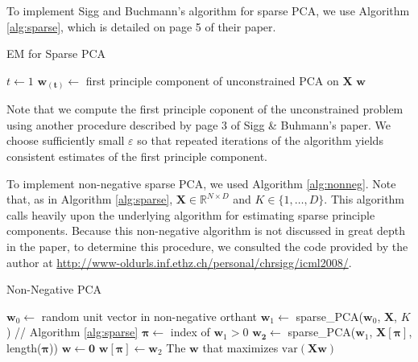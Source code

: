 \documentclass[twocolumn]{article}
\begin{document}
To implement Sigg and Buchmann's algorithm for sparse PCA,
we use Algorithm \ref{alg:sparse}, which is detailed on
page 5 of their paper.

\begin{algorithm}[H]\dontprintsemicolon
  \caption{EM for Sparse PCA}
  \label{alg:sparse}
  $t \leftarrow 1$ \;
  $\mathbf{w_{(t)}} \leftarrow$ first principle component
  of unconstrained PCA on $\mathbf{X}$ \;
  \Return $\mathbf{w}$
\end{algorithm}

Note that we compute the first principle coponent of the
unconstrained problem using another procedure described by
page 3 of Sigg \& Buhmann's paper.
We choose sufficiently small $\varepsilon$ so that repeated
iterations of the algorithm yields consistent estimates of
the first principle component.

To implement non-negative sparse PCA, we used Algorithm \ref{alg:nonneg}.
Note that, as in Algorithm \ref{alg:sparse},
$\mathbf{X} \in \mathds{R}^{ N\times D}$ and $K \in \{1, \ldots, D\}$.
This algorithm calls heavily upon the underlying algorithm for
estimating sparse principle components.
Because this non-negative algorithm is not discussed in great depth
in the paper, to determine this procedure, we consulted the code
provided by the author at
\url{http://www-oldurls.inf.ethz.ch/personal/chrsigg/icml2008/}.

\begin{algorithm}[H]\dontprintsemicolon
  \caption{Non-Negative PCA}
  \label{alg:nonneg}
   {
    $\mathbf{w}_0 \leftarrow$ random unit vector in non-negative orthant \;
    $\mathbf{w}_1 \leftarrow$ sparse\_PCA($\mathbf{w}_0$, $\mathbf{X}$, $K$)
      // Algorithm \ref{alg:sparse} \;
    $\boldsymbol\pi \leftarrow$ index of $\mathbf{w}_1 > 0$ \;
    $\mathbf{w_2} \leftarrow$ sparse\_PCA($\mathbf{w}_1$,
    $\mathbf{X}[\boldsymbol\pi]$, length($\boldsymbol\pi$)) \;
    $\mathbf{w} \leftarrow \mathbf{0}$ \;
    $\mathbf{w}[\boldsymbol\pi] \leftarrow \mathbf{w}_2$
  }
  \Return The $\mathbf{w}$ that maximizes $\textrm{var}(\mathbf{Xw})$
\end{algorithm}
\end{document}
